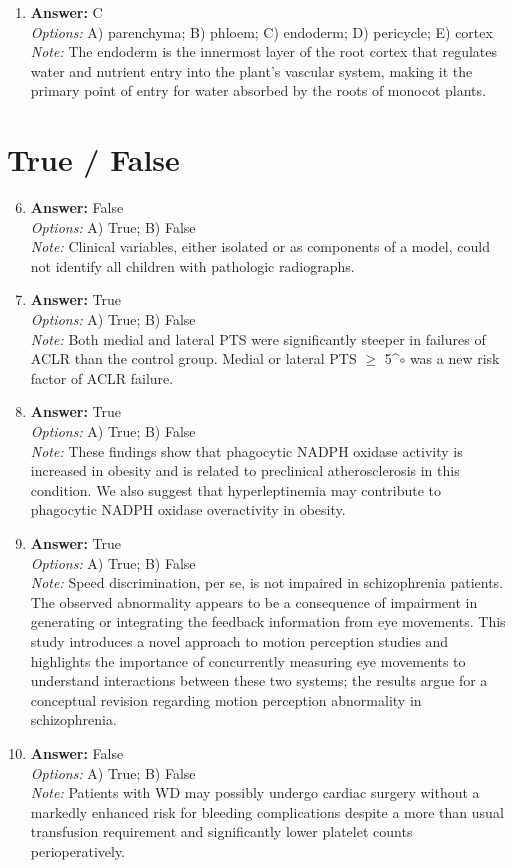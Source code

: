 \documentclass[12pt]{article}
\begin{document}
\begin{enumerate}[label=\arabic*.]
\item \textbf{Answer:} C
\\ \textit{Options:} A) parenchyma; B) phloem; C) endoderm; D) pericycle; E) cortex
\\ \textit{Note:} The endoderm is the innermost layer of the root cortex that regulates water and nutrient entry into the plant's vascular system, making it the primary point of entry for water absorbed by the roots of monocot plants.
\end{enumerate}

\section*{True / False}
\begin{enumerate}[label=\arabic*.]
\setcounter{enumi}{5}
\item \textbf{Answer:} False
\\ \textit{Options:} A) True; B) False
\\ \textit{Note:} Clinical variables, either isolated or as components of a model, could not identify all children with pathologic radiographs.
\item \textbf{Answer:} True
\\ \textit{Options:} A) True; B) False
\\ \textit{Note:} Both medial and lateral PTS were significantly steeper in failures of ACLR than the control group. Medial or lateral PTS \ensuremath{\geq} 5^\ensuremath{\circ} was a new risk factor of ACLR failure.
\item \textbf{Answer:} True
\\ \textit{Options:} A) True; B) False
\\ \textit{Note:} These findings show that phagocytic NADPH oxidase activity is increased in obesity and is related to preclinical atherosclerosis in this condition. We also suggest that hyperleptinemia may contribute to phagocytic NADPH oxidase overactivity in obesity.
\item \textbf{Answer:} True
\\ \textit{Options:} A) True; B) False
\\ \textit{Note:} Speed discrimination, per se, is not impaired in schizophrenia patients. The observed abnormality appears to be a consequence of impairment in generating or integrating the feedback information from eye movements. This study introduces a novel approach to motion perception studies and highlights the importance of concurrently measuring eye movements to understand interactions between these two systems; the results argue for a conceptual revision regarding motion perception abnormality in schizophrenia.
\item \textbf{Answer:} False
\\ \textit{Options:} A) True; B) False
\\ \textit{Note:} Patients with WD may possibly undergo cardiac surgery without a markedly enhanced risk for bleeding complications despite a more than usual transfusion requirement and significantly lower platelet counts perioperatively.
\end{enumerate}
\end{document}
